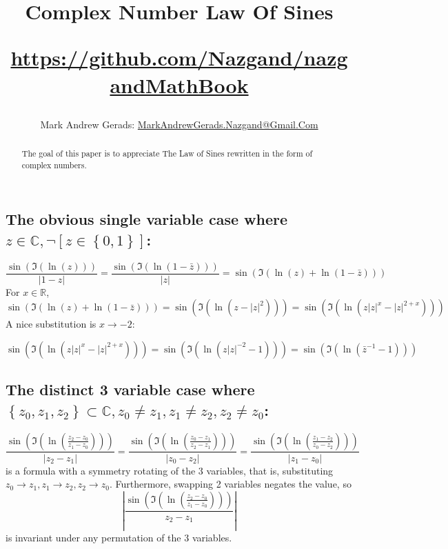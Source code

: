 \documentclass[]{article}
\author{Mark Andrew Gerads: \href{MailTo:MarkAndrewGerads.Nazgand@Gmail.Com}{MarkAndrewGerads.Nazgand@Gmail.Com}}
\title{
	Complex Number Law Of Sines
	
	\href{https://github.com/Nazgand/nazgandMathBook}{https://github.com/Nazgand/nazgandMathBook}
}
\newcommand{\pqty}[1]{{\left(#1\right)}}
\newcommand{\Bqty}[1]{{\left\{#1\right\}}}
\newcommand{\bqty}[1]{{\left[#1\right]}}
\newcommand{\abs}[1]{{\left\lvert#1\right\rvert}}
\numberwithin{equation}{section}
\begin{document}
	
	\maketitle
	
	\begin{abstract}
		The goal of this paper is to appreciate The Law of Sines rewritten in the form of complex numbers.
	\end{abstract}
	
	\subsection{The obvious single variable case where $z\in\mathbb{C},\lnot\bqty{z\in\Bqty{0,1}}$:}
	\begin{equation}
		\frac{\sin\pqty{\Im\pqty{\ln\pqty{z}}}}{\abs{1-z}}=
		\frac{\sin\pqty{\Im\pqty{\ln\pqty{1-\bar{z}}}}}{\abs{z}}=
		\sin\pqty{\Im\pqty{\ln\pqty{z}+\ln\pqty{1-\bar{z}}}}
	\end{equation}
	For $x\in\mathbb{R}$,
	\begin{equation}
		\sin\pqty{\Im\pqty{\ln\pqty{z}+\ln\pqty{1-\bar{z}}}}
		=\sin\pqty{\Im\pqty{\ln\pqty{z-\abs{z}^2}}}
		=\sin\pqty{\Im\pqty{\ln\pqty{z\abs{z}^x-\abs{z}^{2+x}}}}
	\end{equation}
	A nice substitution is $x\to -2$:
	
	\begin{equation}
		\sin\pqty{\Im\pqty{\ln\pqty{z\abs{z}^x-\abs{z}^{2+x}}}}
		=
		\sin\pqty{\Im\pqty{\ln\pqty{z\abs{z}^{-2}-1}}}
		=
		\sin\pqty{\Im\pqty{\ln\pqty{\bar{z}^{-1}-1}}}
	\end{equation}

	\subsection{The distinct 3 variable case where $\Bqty{z_0,z_1,z_2}\subset\mathbb{C},z_0\neq z_1,z_1\neq z_2,z_2\neq z_0$:}
	\begin{equation}
		\frac{\sin\pqty{\Im\pqty{\ln\pqty{\frac{z_2-z_0}{z_1-z_0}}}}}{\abs{z_2-z_1}}
		=\frac{\sin\pqty{\Im\pqty{\ln\pqty{\frac{z_0-z_1}{z_2-z_1}}}}}{\abs{z_0-z_2}}
		=\frac{\sin\pqty{\Im\pqty{\ln\pqty{\frac{z_1-z_2}{z_0-z_2}}}}}{\abs{z_1-z_0}}
	\end{equation}
	is a formula with a symmetry rotating of the 3 variables, that is, substituting
	$z_0\to z_1,z_1\to z_2,z_2\to z_0$. Furthermore, swapping 2 variables negates the value, so
	\begin{equation}
		\abs{\frac{\sin\pqty{\Im\pqty{\ln\pqty{\frac{z_2-z_0}{z_1-z_0}}}}}{z_2-z_1}}
	\end{equation}
	is invariant under any permutation of the 3 variables.
\end{document}
